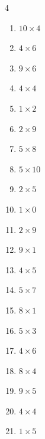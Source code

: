 \begin{multicols}{4}
\begin{enumerate}
  \item $10\times 4$
        \phantom{$=40$}

  \item $4\times 6$
        \phantom{$=24$}

  \item $9\times 6$
        \phantom{$=54$}

  \item $4\times 4$
        \phantom{$=16$}

  \item $1\times 2$
        \phantom{$=2$}

  \item $2\times 9$
        \phantom{$=18$}

  \item $5\times 8$
        \phantom{$=40$}

  \item $5\times 10$
        \phantom{$=50$}

  \item $2\times 5$
        \phantom{$=10$}

  \item $1\times 0$
        \phantom{$=0$}

  \item $2\times 9$
        \phantom{$=18$}

  \item $9\times 1$
        \phantom{$=9$}

  \item $4\times 5$
        \phantom{$=20$}

  \item $5\times 7$
        \phantom{$=35$}

  \item $8\times 1$
        \phantom{$=8$}

  \item $5\times 3$
        \phantom{$=15$}

  \item $4\times 6$
        \phantom{$=24$}

  \item $8\times 4$
        \phantom{$=32$}

  \item $9\times 5$
        \phantom{$=45$}

  \item $4\times 4$
        \phantom{$=16$}

  \item $1\times 5$
        \phantom{$=5$}


\end{enumerate}
\end{multicols}
